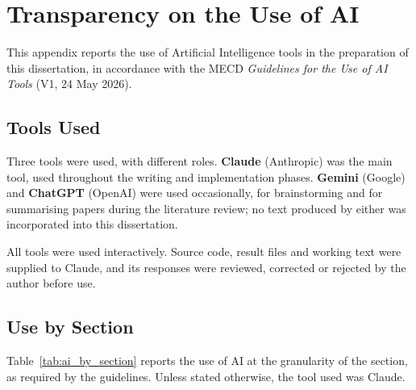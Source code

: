 %

\chapter{Transparency on the Use of AI}
\label{ap2:ai-transparency}

This appendix reports the use of Artificial Intelligence tools in the preparation of this dissertation, in
accordance with the MECD \emph{Guidelines for the Use of AI Tools} (V1, 24 May 2026).

\section{Tools Used}

Three tools were used, with different roles. \textbf{Claude} (Anthropic) was the main tool, used
throughout the writing and implementation phases. \textbf{Gemini} (Google) and \textbf{ChatGPT} (OpenAI)
were used occasionally, for brainstorming and for summarising papers during the literature review; no text
produced by either was incorporated into this dissertation.

All tools were used interactively. Source code, result files and working text were supplied to Claude, and
its responses were reviewed, corrected or rejected by the author before use.

\section{Use by Section}

Table~\ref{tab:ai_by_section} reports the use of AI at the granularity of the section, as required by the
guidelines. Unless stated otherwise, the tool used was Claude.

